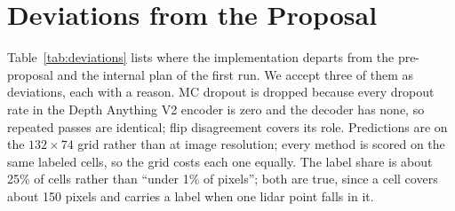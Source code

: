 %
%

\section{Deviations from the Proposal}
\label{app:deviations}

Table~\ref{tab:deviations} lists where the implementation departs from the pre-proposal and the internal plan of the first run. We accept three of them as deviations, each with a reason. MC dropout is dropped because every dropout rate in the Depth Anything V2 encoder is zero and the decoder has none, so repeated passes are identical; flip disagreement covers its role. Predictions are on the $132 \times 74$ grid rather than at image resolution; every method is scored on the same labeled cells, so the grid costs each one equally. The label share is about 25\% of cells rather than ``under 1\% of pixels''; both are true, since a cell covers about 150 pixels and carries a label when one lidar point falls in it. 

